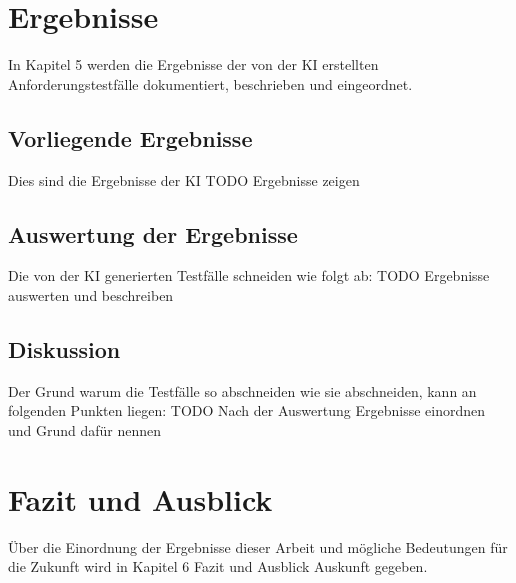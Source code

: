 \documentclass[12pt,toc=bib,toc=listof]{scrreprt}
\begin{document}
\chapter{Ergebnisse} %
\label{sec:ergebnisse}
In Kapitel 5 werden die Ergebnisse der von der KI erstellten Anforderungstestfälle dokumentiert, beschrieben und eingeordnet.

\section{Vorliegende Ergebnisse} %
\label{sec:vorliegendeErgebnisse}
Dies sind die Ergebnisse der KI
TODO Ergebnisse zeigen

\section{Auswertung der Ergebnisse} %
\label{sec:auswertungDerErgebnisse}
Die von der KI generierten Testfälle schneiden wie folgt ab:
TODO Ergebnisse auswerten und beschreiben

\section{Diskussion} %
\label{sec:diskussion}
Der Grund warum die Testfälle so abschneiden wie sie abschneiden, kann an folgenden Punkten liegen:
TODO Nach der Auswertung Ergebnisse einordnen und Grund dafür nennen

\chapter{Fazit und Ausblick} %
\label{sec:fazitUndAusblick}
Über die Einordnung der Ergebnisse dieser Arbeit und mögliche Bedeutungen für die Zukunft wird in Kapitel 6 Fazit und Ausblick Auskunft gegeben.

\printbibliography
\newpage
\end{document}
